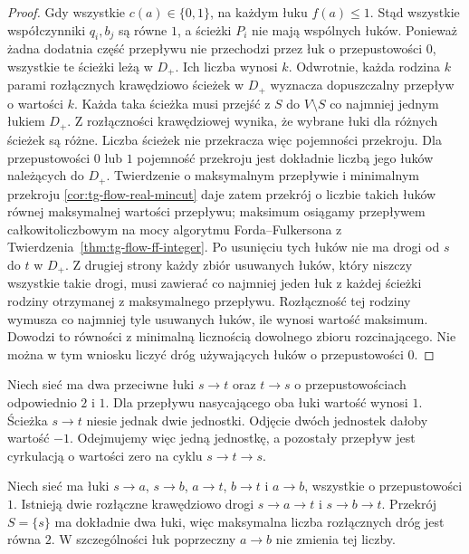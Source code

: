 \begin{proof}
Gdy wszystkie $c(a)\in\{0,1\}$,
na każdym łuku $f(a)\leq1$. Stąd
wszystkie współczynniki $q_i,b_j$
są równe $1$, a ścieżki $P_i$
nie mają wspólnych łuków.
Ponieważ żadna dodatnia część przepływu
nie przechodzi przez łuk o przepustowości $0$,
wszystkie te ścieżki leżą w $D_+$.
Ich liczba wynosi $k$.
Odwrotnie, każda rodzina $k$
parami rozłącznych krawędziowo
ścieżek w $D_+$ wyznacza dopuszczalny
przepływ o wartości $k$.
Każda taka ścieżka musi przejść z $S$ do
$V\setminus S$ co najmniej jednym łukiem $D_+$.
Z rozłączności krawędziowej wynika, że wybrane
łuki dla różnych ścieżek są różne. Liczba
ścieżek nie przekracza więc pojemności przekroju.
Dla przepustowości $0$ lub $1$
pojemność przekroju jest dokładnie
liczbą jego łuków należących do $D_+$.
Twierdzenie o maksymalnym przepływie
i minimalnym przekroju
\ref{cor:tg-flow-real-mincut}
daje zatem przekrój o liczbie takich łuków
równej maksymalnej wartości
przepływu; maksimum osiągamy
przepływem całkowitoliczbowym
na mocy algorytmu Forda--Fulkersona
z Twierdzenia~\ref{thm:tg-flow-ff-integer}.
Po usunięciu tych łuków
nie ma drogi od $s$ do $t$ w $D_+$.
Z drugiej strony każdy zbiór usuwanych łuków,
który niszczy wszystkie takie drogi, musi zawierać
co najmniej jeden łuk z każdej ścieżki rodziny
otrzymanej z maksymalnego przepływu.
Rozłączność tej rodziny wymusza co najmniej tyle
usuwanych łuków, ile wynosi wartość maksimum.
Dowodzi to równości z minimalną licznością
dowolnego zbioru rozcinającego.
Nie można w tym wniosku liczyć dróg
używających łuków o przepustowości $0$.
\end{proof}

\begin{przyklad}
Niech sieć ma dwa przeciwne łuki $s\to t$ oraz $t\to s$
o przepustowościach odpowiednio $2$ i $1$.
Dla przepływu nasycającego oba łuki wartość wynosi $1$.
Ścieżka $s\to t$ niesie jednak dwie jednostki.
Odjęcie dwóch jednostek dałoby wartość $-1$.
Odejmujemy więc jedną jednostkę, a pozostały przepływ
jest cyrkulacją o wartości zero na cyklu $s\to t\to s$.
\end{przyklad}

\begin{przyklad}
\label{ex:tg-flow-integral-paths}
Niech sieć ma łuki
$s\to a$, $s\to b$, $a\to t$, $b\to t$
i $a\to b$, wszystkie o przepustowości $1$.
Istnieją dwie rozłączne krawędziowo drogi
$s\to a\to t$ i $s\to b\to t$.
Przekrój $S=\{s\}$ ma dokładnie dwa łuki,
więc maksymalna liczba rozłącznych dróg
jest równa $2$. W szczególności
łuk poprzeczny $a\to b$ nie zmienia
tej liczby.
\end{przyklad}

